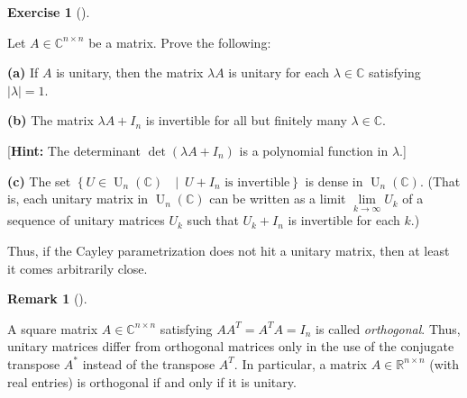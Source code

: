\documentclass[numbers=enddot,12pt,final,onecolumn,notitlepage]{scrartcl}%
\newcounter{exer}
\numberwithin{exer}{subsection}
\theoremstyle{definition}
\newtheorem{remk}[theo]{Remark}
\newenvironment{remark}[1][]
{\begin{remk}[#1]\begin{leftbar}}
{\end{leftbar}\end{remk}}
\newtheorem{exmp}[exer]{Exercise}
\newenvironment{exercise}[1][]
{\begin{exmp}[#1]\begin{leftbar}}
{\end{leftbar}\end{exmp}}
\begin{document}
\begin{exercise}
\label{exe.unitary.skew-herm.2} Let $A\in\mathbb{C}^{n\times n}$ be a
matrix. Prove the following:

\textbf{(a)} If $A$ is unitary, then the matrix $\lambda A$ is unitary for
each $\lambda\in\mathbb{C}$ satisfying $\left\vert \lambda\right\vert =1$.

\textbf{(b)} The matrix $\lambda A+I_{n}$ is invertible for all but finitely
many $\lambda\in\mathbb{C}$.

[\textbf{Hint:} The determinant $\det\left(  \lambda A+I_{n}\right)  $ is a
polynomial function in $\lambda$.]

\textbf{(c)} The set $\left\{  U\in\operatorname*{U}\nolimits_{n}\left(
\mathbb{C}\right)  \text{ }\mid\ U+I_{n}\text{ is invertible}\right\}  $ is
dense in $\operatorname*{U}\nolimits_{n}\left(  \mathbb{C}\right)  $. (That
is, each unitary matrix in $\operatorname*{U}\nolimits_{n}\left(
\mathbb{C}\right)  $ can be written as a limit $\lim\limits_{k\rightarrow
\infty}U_{k}$ of a sequence of unitary matrices $U_{k}$ such that $U_{k}%
+I_{n}$ is invertible for each $k$.)
\end{exercise}

Thus, if the Cayley parametrization does not hit a unitary matrix, then at
least it comes arbitrarily close.

\begin{remark}
A square matrix $A\in\mathbb{C}^{n\times n}$ satisfying $AA^{T}=A^{T}A=I_{n}$
is called \emph{orthogonal}. Thus, unitary matrices differ from orthogonal
matrices only in the use of the conjugate transpose $A^{\ast}$ instead of the
transpose $A^{T}$. In particular, a matrix $A\in\mathbb{R}^{n\times n}$ (with
real entries) is orthogonal if and only if it is unitary.
\end{remark}
\end{document}
